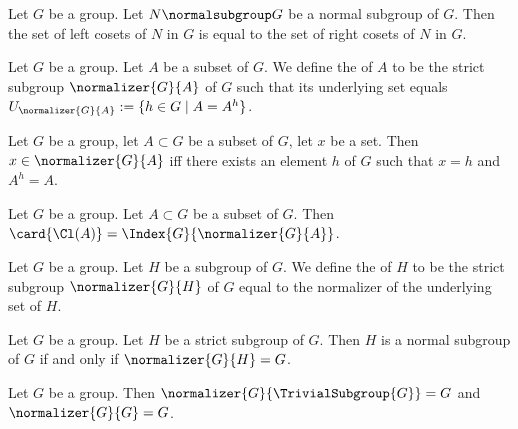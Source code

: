 \begin{theorem}
Let $G$ be a group. Let $N\normalsubgroup G$ be a normal subgroup of $G$.
Then the set of left cosets of $N$ in $G$ is equal to the set of right
cosets of $N$ in $G$.
\end{theorem}

\begin{definition}
Let $G$ be a group. Let $A$ be a subset of $G$.
We define the  of $A$ to be the strict subgroup $\normalizer{G}{A}$
of $G$ such that its underlying set equals
$U_{\normalizer{G}{A}}:=\{h\in G\mid A=A^{h}\}$.
\end{definition}

\begin{theorem}
Let $G$ be a group, let $A\subset G$ be a subset of $G$, let $x$ be a set.
Then $x\in\normalizer{G}{A}$ iff there exists an element $h$ of $G$
such that $x=h$ and $A^{h}=A$.
\end{theorem}

\begin{theorem}
Let $G$ be a group. Let $A\subset G$ be a subset of $G$.
Then $\card{\Cl(A)}=\Index{G}{\normalizer{G}{A}}$.
\end{theorem}

\begin{definition}
Let $G$ be a group. Let $H$ be a subgroup of $G$.
We define the  of $H$ to be the strict subgroup
$\normalizer{G}{H}$ of $G$ equal to the normalizer of the underlying
set of $H$.
\end{definition}

\begin{theorem}
Let $G$ be a group. Let $H$ be a strict subgroup of $G$.
Then $H$ is a normal subgroup of $G$ if and only if $\normalizer{G}{H}=G$.
\end{theorem}

\begin{theorem}
Let $G$ be a group. Then $\normalizer{G}{\TrivialSubgroup{G}}=G$ and
$\normalizer{G}{G}=G$. 
\end{theorem}

